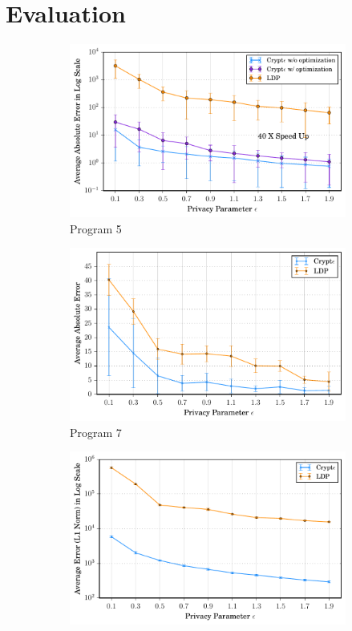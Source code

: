 \section{Evaluation}\label{sec:evaluation}
\begin{figure}
    \begin{subfigure}[b]{0.25\linewidth}
    \centering \includegraphics[width=1\linewidth]{t5_final.pdf}
        \caption{Program 5}
        \label{fig:accuracy_p5}\end{subfigure}%
    \begin{subfigure}[b]{0.25\linewidth}
    \centering    \includegraphics[width=1\linewidth]{t7_final.pdf}
        \caption{ Program 7}
        \label{fig:accuracy_p7}\end{subfigure}%
      \begin{subfigure}[b]{0.25\linewidth}
    \centering    \includegraphics[width=1\linewidth]{t3_final.pdf}

\end{subfigure}
\end{figure}
